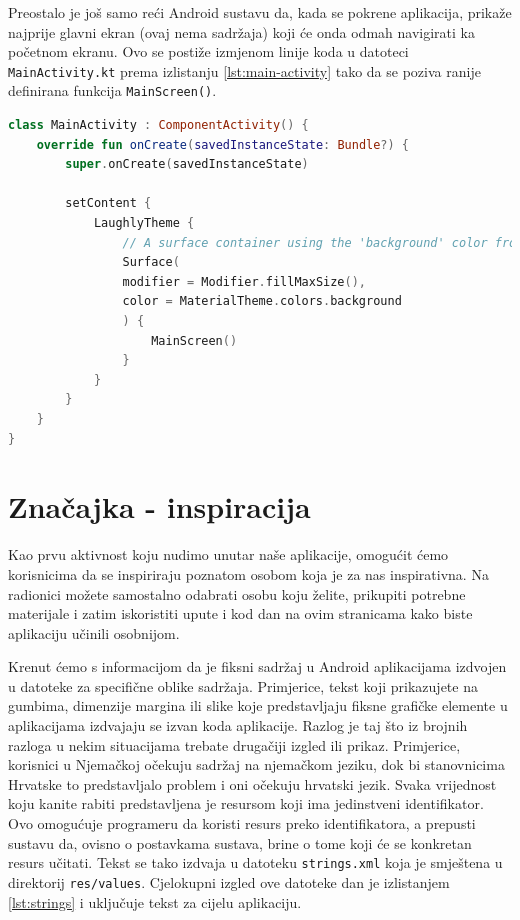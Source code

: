 \documentclass[11pt,a4paper,twoside]{article}
\begin{document}
Preostalo je još samo reći Android sustavu da, kada se pokrene aplikacija, prikaže najprije glavni ekran (ovaj nema sadržaja) koji će onda odmah navigirati ka početnom ekranu. Ovo se postiže izmjenom linije koda u datoteci \texttt{MainActivity.kt} prema izlistanju \ref{lst:main-activity} tako da se poziva ranije definirana funkcija \texttt{MainScreen()}.

\begin{lstlisting}[caption={Glavna aktivnost - MainActivity.kt}, label={lst:activity-main}, language=Kotlin]
class MainActivity : ComponentActivity() {
	override fun onCreate(savedInstanceState: Bundle?) {
		super.onCreate(savedInstanceState)
		
		setContent {
			LaughlyTheme {
				// A surface container using the 'background' color from the theme
				Surface(
				modifier = Modifier.fillMaxSize(),
				color = MaterialTheme.colors.background
				) {
					MainScreen()
				}
			}
		}
	}
}
\end{lstlisting}


\section{Značajka - inspiracija}

Kao prvu aktivnost koju nudimo unutar naše aplikacije, omogućit ćemo korisnicima da se inspiriraju poznatom osobom koja je za nas inspirativna. Na radionici možete samostalno odabrati osobu koju želite, prikupiti potrebne materijale i zatim iskoristiti upute i kod dan na ovim stranicama kako biste aplikaciju učinili osobnijom. 

Krenut ćemo s informacijom da je fiksni sadržaj u Android aplikacijama izdvojen u datoteke za specifične oblike sadržaja. Primjerice, tekst koji prikazujete na gumbima, dimenzije margina ili slike koje predstavljaju fiksne grafičke elemente u aplikacijama izdvajaju se izvan koda aplikacije. Razlog je taj što iz brojnih razloga u nekim situacijama trebate drugačiji izgled ili prikaz. Primjerice, korisnici u Njemačkoj očekuju sadržaj na njemačkom jeziku, dok bi stanovnicima Hrvatske to predstavljalo problem i oni očekuju hrvatski jezik. Svaka vrijednost koju kanite rabiti predstavljena je resursom koji ima jedinstveni identifikator. Ovo omogućuje programeru da koristi resurs preko identifikatora, a prepusti sustavu da, ovisno o postavkama sustava, brine o tome koji će se konkretan resurs učitati. Tekst se tako izdvaja u datoteku \texttt{strings.xml} koja je smještena u direktorij \texttt{res/values}. Cjelokupni izgled ove datoteke dan je izlistanjem \ref{lst:strings} i uključuje tekst za cijelu aplikaciju.
\end{document}

